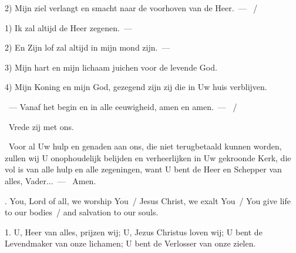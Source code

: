 \documentclass[12pt,twoside,a5paper]{article}
\begin{document}
\begin{halfparskip}
  2) Mijn ziel verlangt en smacht naar de voorhoven van de Heer.~--- ~/ 
\end{halfparskip}

\begin{halfparskip}
   1) Ik zal altijd de Heer zegenen.~---   

  2) En Zijn lof zal altijd in mijn mond zijn.~---   
\end{halfparskip}

\begin{halfparskip}
   3) Mijn hart en mijn lichaam juichen voor de levende God.

  4) Mijn Koning en mijn God, gezegend zijn zij die in Uw huis verblijven.
\end{halfparskip}

\begin{halfparskip}

  ~--- Vanaf het begin en in alle eeuwigheid, amen en amen.~--- ~/ 

  \dd~Vrede zij met ons.

  \cc~Voor al Uw hulp en genaden aan ons, die niet terugbetaald kunnen worden, zullen wij U onophoudelijk belijden en verheerlijken in Uw gekroonde Kerk, die vol is van alle hulp en alle zegeningen, want U bent de Heer en Schepper van alles, Vader...~--- \rr~Amen.
\end{halfparskip}



\vspace{0.4em}
\begin{doublecols}
  \textsizex

  . You, Lord of all, we worship You~/ Jesus Christ, we exalt You~/ You give life to our bodies~/ and salvation to our souls.

   1. U, Heer van alles, prijzen wij; U, Jezus Christus loven wij; U bent de Levendmaker van onze lichamen; U bent de Verlosser van onze zielen.
\end{doublecols}
\end{document}
